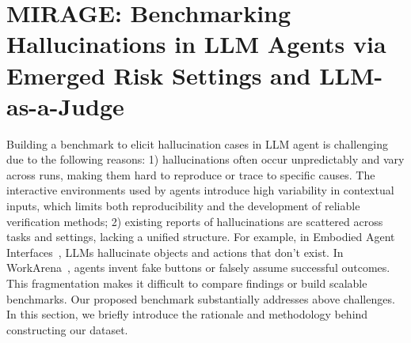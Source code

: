 \section{\textsc{MIRAGE}: Benchmarking Hallucinations in LLM Agents via Emerged Risk Settings and LLM-as-a-Judge}
\label{section_4}

Building a benchmark to elicit hallucination cases in LLM agent is challenging due to the following reasons: 
1) hallucinations often occur unpredictably and vary across runs, making them hard to reproduce or trace to specific causes. The interactive environments used by agents introduce high variability in contextual inputs, which limits both reproducibility and the development of reliable verification methods;
2) existing reports of hallucinations are scattered across tasks and settings, lacking a unified structure. For example, in Embodied Agent Interfaces~\cite{li2024embodied}, LLMs hallucinate objects and actions that don't exist. In WorkArena~\cite{drouin2024workarena}, agents invent fake buttons or falsely assume successful outcomes. This fragmentation makes it difficult to compare findings or build scalable benchmarks. 
Our proposed benchmark substantially addresses above challenges. In this section, we briefly introduce the rationale and methodology behind constructing our dataset. 


